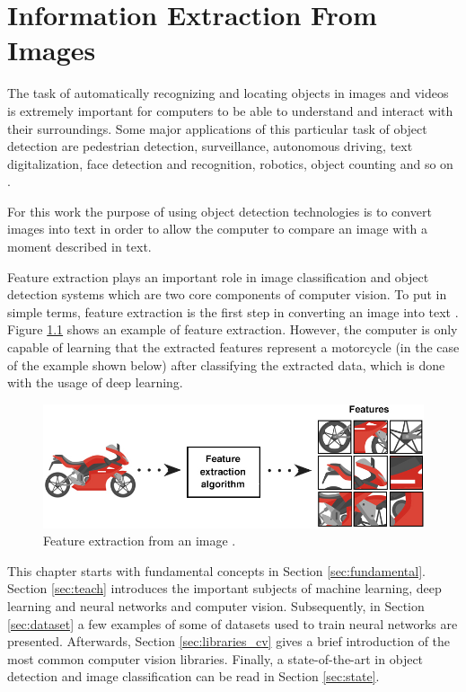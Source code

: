 \cleardoublepage


\chapter{Information Extraction From Images}
\label{ch:computervision}



The task of automatically recognizing and locating objects in images and videos is extremely important for computers to be able to understand and interact with their surroundings. Some major applications of this particular task of object detection are pedestrian detection, surveillance, autonomous driving, text digitalization, face detection and recognition, robotics, object counting and so on \cite{Agarwal2019}. 

For this work the purpose of using object detection technologies is to convert images into text in order to allow the computer to compare an image with a moment described in text.

Feature extraction plays an important role in image classification and object detection systems which are two core components of computer vision. To put in simple terms, feature extraction is the first step in converting an image into text \cite{Tiwari2013}. Figure \ref{fig:feature_extraction} shows an example of feature extraction. However, the computer is only capable of learning that the extracted features represent a motorcycle (in the case of the example shown below) after classifying the extracted data, which is done with the usage of deep learning.





\begin{figure}[H]
    \centering
    \includegraphics[scale = 0.55]{Sections/2StateOfTheArt/2_images/Feature_extraction.png}
    \caption[Feature extraction from an image.]{Feature extraction from an image \cite{feature}.}  
    \label{fig:feature_extraction}
\end{figure}


\par This chapter starts with fundamental concepts in Section \ref{sec:fundamental}. Section \ref{sec:teach} introduces the important subjects of machine learning, deep learning and neural networks and computer vision. Subsequently, in Section \ref{sec:dataset} a few examples of some of datasets used to train neural networks are presented. Afterwards, Section \ref{sec:libraries_cv} gives a brief introduction of the most common computer vision libraries.  Finally, a state-of-the-art in object detection and image classification can be read in Section \ref{sec:state}.

